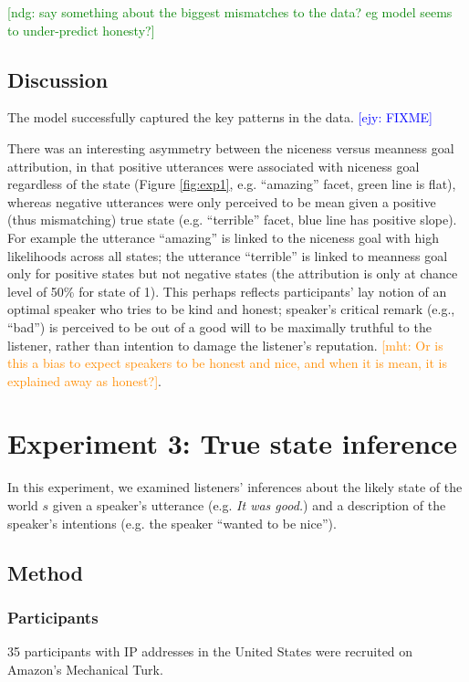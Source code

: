 \documentclass[10pt,letterpaper]{article}
\newcommand{\ndg}[1]{\textcolor{Green}{[ndg: #1]}}
\newcommand{\mht}[1]{\textcolor{DarkOrange}{[mht: #1]}}
\newcommand{\ejy}[1]{\textcolor{Blue}{[ejy: #1]}}
\begin{document}
\ndg{say something about the biggest mismatches to the data? eg model seems to under-predict honesty?}

\subsection{Discussion}

The model successfully captured the key patterns in the data. \ejy{FIXME}

There was an interesting asymmetry between the niceness versus meanness goal attribution, in that positive utterances were associated with niceness goal regardless of the state (Figure \ref{fig:exp1}, e.g. ``amazing'' facet, green line is flat), whereas negative utterances were only perceived to be mean given a positive (thus mismatching) true state (e.g. ``terrible'' facet, blue line has positive slope). For example the utterance ``amazing'' is linked to the niceness goal with high likelihoods across all states; the utterance ``terrible'' is linked to meanness goal only for positive states but not negative states (the attribution is only at chance level of 50\% for state of 1). This perhaps reflects participants' lay notion of an optimal speaker who tries to be kind and honest; speaker's critical remark (e.g., ``bad'') is perceived to be out of a good will to be maximally truthful to the listener, rather than intention to damage the listener's reputation. \mht{Or is this a bias to expect speakers to be honest and nice, and when it is mean, it is explained away as honest?}.

\section{Experiment 3: True state inference}

In this experiment, we examined listeners' inferences about the likely state of the world $s$ given a speaker's utterance (e.g. \emph{It was good.}) and a description of the speaker's intentions (e.g. the speaker ``wanted to be nice'').

\subsection{Method}

\subsubsection{Participants}

35 participants with IP addresses in the United States were recruited on Amazon's Mechanical Turk. 
\end{document}
